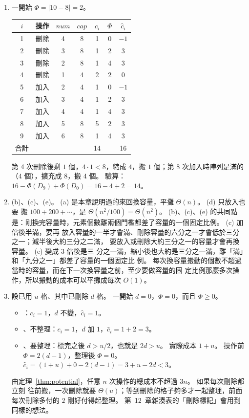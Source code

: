 \begin{enumerate}
\item 一開始 $\Phi = |10 - 8| = 2$。
\begin{center}
\begin{tabular}{clccccc}
\toprule
$i$ & 操作 & $\mathit{num}$ & $\mathit{cap}$ & $c_i$ & $\Phi$ & $\hat{c}_i$ \\
\midrule
1 & 刪除 & 4 & 8 & 1 & 0 & $-1$ \\
2 & 刪除 & 3 & 8 & 1 & 2 & 3 \\
3 & 刪除 & 2 & 8 & 1 & 4 & 3 \\
4 & 刪除 & 1 & 4 & 2 & 2 & 0 \\
5 & 加入 & 2 & 4 & 1 & 0 & $-1$ \\
6 & 加入 & 3 & 4 & 1 & 2 & 3 \\
7 & 加入 & 4 & 4 & 1 & 4 & 3 \\
8 & 加入 & 5 & 8 & 5 & 2 & 3 \\
9 & 加入 & 6 & 8 & 1 & 4 & 3 \\
\midrule
合計 & & & & 14 & & 16 \\
\bottomrule
\end{tabular}
\end{center}
第 4 次刪除後剩 $1$ 個，$4 \cdot 1 < 8$，縮成 $4$，搬 $1$ 個；第 8 次加入時陣列是滿的
（$4$ 個），擴充成 $8$，搬 $4$ 個。 驗算：$16 - \Phi(D_9) + \Phi(D_0) = 16 - 4 + 2
= 14$。

\item (b)、(c)、(e)。 (a) 是本章說明過的來回換容量，平攤 $\Theta(n)$。 (d) 只放入也要
搬 $100 + 200 + \cdots$，是 $\Theta(n^2/100) = \Theta(n^2)$。 (b)、(c)、(e) 的共同點
是：剛換完容量時，元素個數離兩個門檻都差了容量的一個固定比例。 (c) 加倍後半滿，要再
放入容量的一半才會滿、刪除容量的六分之一才會低於三分之一；減半後大約三分之二滿，
要放入或刪除大約三分之一的容量才會再換容量。 (e) 變成 $3$ 倍後是三
分之一滿，縮小後也大約是三分之一滿，離「滿」和「九分之一」都差了容量的一個固定比
例。 每次換容量搬動的個數不超過當時的容量，而在下一次換容量之前，至少要做容量的固
定比例那麼多次操作，所以搬動的成本可以平攤成每次 $O(1)$。

\item 設已用 $u$ 格、其中已刪除 $d$ 格。 一開始 $d = 0$，$\Phi = 0$，而且
$\Phi \ge 0$。
\begin{itemize}
\item {}：$c_i = 1$，$d$ 不變，$\hat{c}_i = 1$。
\item {}、不整理：$c_i = 1$，$d$ 加 $1$，$\hat{c}_i = 1 + 2 = 3$。
\item {}、要整理：標完之後 $d > u/2$，也就是 $2d > u$。 實際成本 $1 + u$。
操作前 $\Phi = 2(d - 1)$，整理後 $\Phi = 0$。
$\hat{c}_i = (1 + u) + 0 - 2(d - 1) = 3 + u - 2d < 3$。
\end{itemize}
由定理~\ref{thm:potential}，任意 $n$ 次操作的總成本不超過 $3n$。 如果每次刪除都立刻
往前搬，一次刪除就要 $\Theta(u)$；等到刪除的格子夠多才一起整理，前面每次刪除多付的
$2$ 剛好付得起整理。 第~12~章雜湊表的「刪除標記」會用到同樣的想法。


\end{enumerate}
